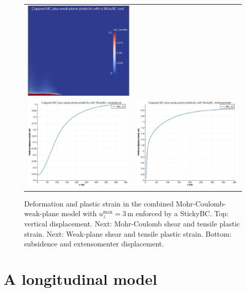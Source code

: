 \documentclass[]{scrreprt}
\begin{document}
\begin{figure}[p]
\begin{center}
\begin{tabular}{cc}
\includegraphics[width=6cm]{mc_wp_sticky_wp_tensile.pdf} \\
\includegraphics[width=6cm]{mc_wp_sticky_subsidence.pdf} &
\includegraphics[width=6cm]{mc_wp_sticky_extensometer.pdf}
\end{tabular}
\caption{Deformation and plastic strain in the combined Mohr-Coulomb-weak-plane model with
  $u_{z}^{\mathrm{max}} = 3$\,m enforced by a StickyBC.  Top:
  vertical displacement.  Next: Mohr-Coulomb shear and tensile plastic
  strain.  Next: Weak-plane shear and tensile plastic strain.
  Bottom: subsidence and extensomenter displacement.}
\label{mc_wp_sticky}
\end{center}
\end{figure}


\chapter{A longitudinal model}
\label{long.model.setup}
\end{document}
